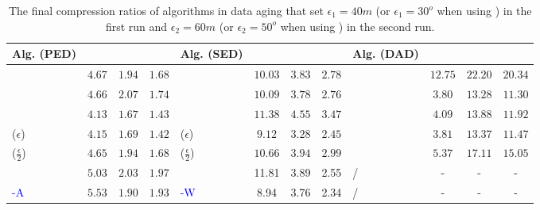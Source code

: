 {\begin{table}
	\vspace{-2ex}
\end{table}


   	 	
\begin{table}
	\caption{\small The final compression ratios of algorithms in data aging that set $\epsilon_1=40m$ (or $\epsilon_1=30^o$ when using \dad) in the first run and $\epsilon_2=60m$ (or $\epsilon_2=50^o$ when using \dad) in the second run.}
	\centering
	\scriptsize
	\vspace{-1ex}
	\begin{tabular}{|l|c|c|c|l|c|c|c|l|c|c|c|}
		\hline
		\bf{Alg. (PED)}  &\ucar &\geolife &\mopsi & \bf{Alg. (SED)}  &\ucar &\geolife &\mopsi &\bf{Alg. (DAD)}  &\ucar &\geolife &\mopsi \\
		\hline  		
		{\dpa} &	$4.67$ & $1.94 $ &	$1.68$	&\dpa &$10.03$ &$3.83$ & $2.78 $ & \dpa	& $12.75$	& $22.20$	& $20.34 $ \\
		\hline
		{\tpa} &	$4.66$ & $	2.07 $ &	$1.74 $	&\tpa 	& $10.09$& $3.78$ &$2.76$ & \tpa	& $3.80$	& $13.28$	& $11.30$ \\
		\hline
		{\bqsa} &	$4.13$ & $1.67 $ &	$ 1.43 $	&\squishe &$11.38$ &$4.55$ & $3.47$ & \opwa	& $4.09$	& $13.88$	& $11.92$ \\
		\hline
		{\siped($\epsilon$)} &	$4.15 $ & $1.69 $ &	$1.42$	&\cised($\epsilon$) & $9.12$ &$3.28$ &$2.45 $ & \interval	& $3.81$	& $13.37$	& $11.47 $ \\
		\hline
		{\siped($\frac{\epsilon}{2}$)} &	$4.65 $ & $1.94$ &	$1.68$ &\cised($\frac{\epsilon}{2}$) &$10.66 $ & $3.94$ & $2.99 $& \intersec	& $5.37$	& $17.11$	& $15.05 $ \\
		\hline
		{\operb} &	$5.03$ & $2.03 $ &	$ 1.97 $	& \textcolor{blue}{\dagots} &11.81 &3.89 &2.55 & / &- &- & - \\
		\hline
		\textcolor{blue}{\operb-A} &	${5.53} $ & ${1.90} $ & ${1.93} $	& \textcolor{blue}{\cised-W} &8.94 &3.76 &2.34 & / &- &- &- \\
		\hline
	\end{tabular}
	\label{tab:aging-cr}	
	\vspace{-2ex}
\end{table}

 	 	
   	 	
}

